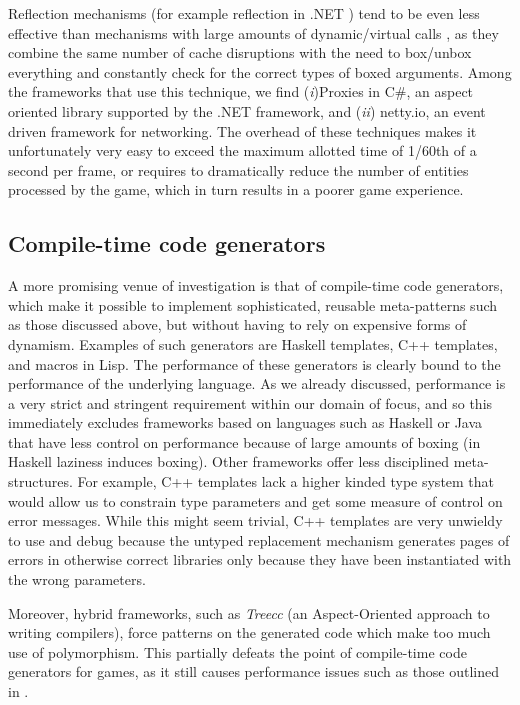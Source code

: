 Reflection mechanisms (for example reflection in .NET \cite{richter2012clr}) tend to be even less effective than mechanisms with large amounts of dynamic/virtual calls , as they combine the same number of cache disruptions with the need to box/unbox everything and constantly check for the correct types of boxed arguments. Among the frameworks that use this technique, we find (\textit{i})Proxies in C\#, an aspect oriented library supported by the .NET framework, and (\textit{ii}) netty.io, an event driven framework for networking. The overhead of these techniques makes it unfortunately very easy to exceed the maximum allotted time of 1/60th of a second per frame, or requires to dramatically reduce the number of entities processed by the game, which in turn results in a poorer game experience.


\subsection{Compile-time code generators}

A more promising venue of investigation is that of compile-time code generators, which make it possible to implement sophisticated, reusable meta-patterns such as those discussed above, but without having to rely on expensive forms of dynamism. Examples of such generators are Haskell templates, C++ templates, and macros in Lisp. The performance of these generators is clearly bound to the performance of the underlying language. As we already discussed, performance is a very strict and stringent requirement within our domain of focus, and so this immediately excludes frameworks based on languages such as Haskell or Java that have less control on performance because of large amounts of boxing (in Haskell laziness induces boxing). Other frameworks offer less disciplined meta-structures. For example, C++ templates lack a higher kinded type system that would allow us to constrain type parameters and get some measure of control on error messages. While this might seem trivial, C++ templates are very unwieldy to use and debug because the untyped replacement mechanism generates pages of errors in otherwise correct libraries only because they have been instantiated with the wrong parameters.

Moreover, hybrid frameworks, such as \textit{Treecc} (an Aspect-Oriented approach to writing compilers), force patterns on the generated code which make too much use of polymorphism. This partially defeats the point of compile-time code generators for games, as it still causes performance issues such as those outlined in \cite{ungar1992object}.

